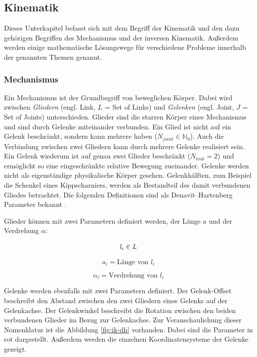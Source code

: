 \subsection{Kinematik }
\label{sec:basics-ik}
    
Dieses Unterkapitel befasst sich mit dem Begriff der Kinematik und den dazu gehörigen Begriffen des Mechanismus und der inversen Kinematik. Außerdem werden einige mathematische Lösungswege für verschiedene Probleme innerhalb der genannten Themen genannt.

\subsubsection{Mechanismus}

Ein Mechanismus ist der Grundbegriff von beweglichen Körper. Dabei wird zwischen \textit{Gliedern} (engl. Link, $L$ = Set of Links) und \textit{Gelenken} (engl. Joint, $J$ = Set of Joints) unterschieden. Glieder sind die starren Körper eines Mechanismus und sind durch Gelenke miteinander verbunden. Ein Glied ist nicht auf ein Gelenk beschränkt, sondern kann mehrere haben ($N_{joint} \in \mathds{N}_0$). Auch die Verbindung zwischen zwei Gliedern kann durch mehrere  Gelenke realisiert sein. Ein Gelenk wiederum ist auf genau zwei Glieder beschränkt  ($N_{link} = 2$) und ermöglicht so eine eingeschränkte relative Bewegung zueinander. Gelenke werden nicht als eigenständige physikalische Körper gesehen. Gelenkhälften, zum Beispiel die Schenkel eines Kippscharniers, werden als Bestandteil des damit verbundenen Gliedes betrachtet. Die folgenden Definitionen sind als Denavit–Hartenberg Parameter bekannt \citep{Corke2011}.

Glieder können mit zwei Parametern definiert werden, der Länge $a$ und der Verdrehung $\alpha$:

\begin{displaymath}
	l_i \in L \\
\end{displaymath}

\begin{equation}
a_i =  \text{Länge von } l_i
\end{equation}

\begin{equation}
\alpha_i =  \text{Verdrehung von } l_i 
\end{equation}

Gelenke werden ebenfalls mit zwei Parametern definiert. Der Gelenk-Offset beschreibt den Abstand zwischen den zwei Gliedern eines Gelenks auf der Gelenkachse. Der Gelenkwinkel beschreibt die Rotation zwischen den beiden verbundenen Glieder im Bezug zur Gelenkachse\citep{Corke2011}.  Zur Veranschaulichung dieser Nomenklatur ist die Abbildung \ref{fig:ik-dh} vorhanden. Dabei sind die Parameter in rot dargestellt. Außerdem werden die einzelnen Koordinatensysteme der Gelenke gezeigt.

